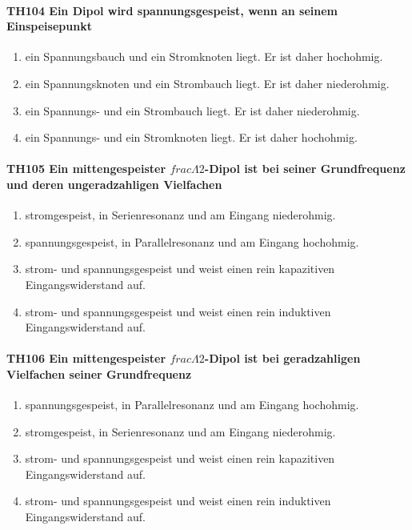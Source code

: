 \documentclass[8pt]{article}
\begin{document}
\paragraph*{TH104 Ein Dipol wird spannungsgespeist, wenn an seinem Einspeisepunkt}
\begin{enumerate}[nolistsep,label=\Alph*]
\item ein Spannungsbauch und ein Stromknoten liegt. Er ist daher hochohmig.
\item ein Spannungsknoten und ein Strombauch liegt. Er ist daher niederohmig.
\item ein Spannungs- und ein Strombauch liegt. Er ist daher niederohmig.
\item ein Spannungs- und ein Stromknoten liegt. Er ist daher hochohmig.
\end{enumerate}

\paragraph*{TH105 Ein mittengespeister $frac{\Lambda}{2}$-Dipol ist bei seiner Grundfrequenz und deren ungeradzahligen Vielfachen}
\begin{enumerate}[nolistsep,label=\Alph*]
\item stromgespeist, in Serienresonanz und am Eingang niederohmig.
\item spannungsgespeist, in Parallelresonanz und am Eingang hochohmig.
\item strom- und spannungsgespeist und weist einen rein kapazitiven Eingangswiderstand auf.
\item strom- und spannungsgespeist und weist einen rein induktiven Eingangswiderstand auf.
\end{enumerate}

\paragraph*{TH106 Ein mittengespeister $frac{\Lambda}{2}$-Dipol ist bei geradzahligen Vielfachen seiner Grundfrequenz} 
\begin{enumerate}[nolistsep,label=\Alph*]
\item spannungsgespeist, in Parallelresonanz und am Eingang hochohmig.
\item stromgespeist, in Serienresonanz und am Eingang niederohmig.
\item strom- und spannungsgespeist und weist einen rein kapazitiven Eingangswiderstand auf. 
\item strom- und spannungsgespeist und weist einen rein induktiven Eingangswiderstand auf.
\end{enumerate}
\end{document}
